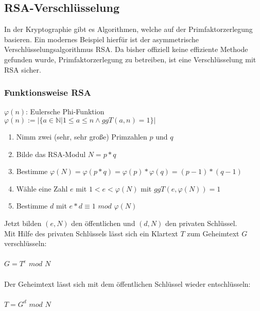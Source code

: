 \documentclass[a4paper,12pt]{article}
\begin{document}
\subsection{RSA-Verschlüsselung} 
In der Kryptographie gibt es Algorithmen, welche auf der Primfaktorzerlegung basieren. Ein modernes Beispiel hierfür ist der asymmetrische Verschlüsselungsalgorithmus RSA. Da bisher offiziell keine effiziente Methode gefunden wurde, Primfaktorzerlegung zu betreiben, ist eine Verschlüsselung mit RSA sicher.

\subsubsection{Funktionsweise RSA}
$\varphi(n)$: Eulersche Phi-Funktion\\
$\varphi(n) := |\{a \in \mathbb{N}|1\leq a\leq n \land ggT(a,n) = 1\}|$

\begin{enumerate}
\item Nimm zwei (sehr, sehr große) Primzahlen $p$ und $q$
\item Bilde das RSA-Modul $N = p * q$
\item Bestimme $\varphi(N) = \varphi(p * q) = \varphi(p) * \varphi(q) = (p-1) * (q-1)$
\item Wähle eine Zahl $e$ mit $1 < e < \varphi(N)$ mit $ggT(e, \varphi(N)) = 1$
\item Bestimme $d$ mit $e*d \equiv 1$  $mod$ $\varphi(N)$
\end{enumerate}

\noindent Jetzt bilden $(e,N)$ den öffentlichen und $(d,N)$ den privaten Schlüssel.\\
Mit Hilfe des privaten Schlüssels lässt sich ein Klartext $T$ zum Geheimtext $G$ verschlüsseln:\\\\
\indent $G = T^e$ $mod$ $N$\\\\
\noindent Der Geheimtext lässt sich mit dem öffentlichen Schlüssel wieder entschlüsseln:\\\\
\indent $T = G^d$ $mod$ $N$\\
\end{document}
